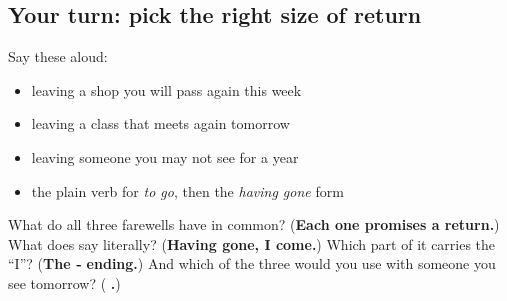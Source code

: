 \subsection*{Your turn: pick the right size of return}
Say these aloud:

\begin{itemize}
\raggedright
  \item leaving a shop you will pass again this week
  \item leaving a class that meets again tomorrow
  \item leaving someone you may not see for a year
  \item the plain verb for \emph{to go}, then the \emph{having gone} form
\end{itemize}

\begin{tcolorbox}[breakable,colback=teal!4,colframe=teal!35!black,title={Before you move on}]
What do all three farewells have in common? (\textbf{Each one promises a return.}) What does \textbf{ } say literally? (\textbf{Having gone, I come.}) Which part of it carries the \textquotedblleft{}I\textquotedblright{}? (\textbf{The ‑ ending.}) And which of the three would you use with someone you see tomorrow? (\textbf{ .})
\end{tcolorbox}

